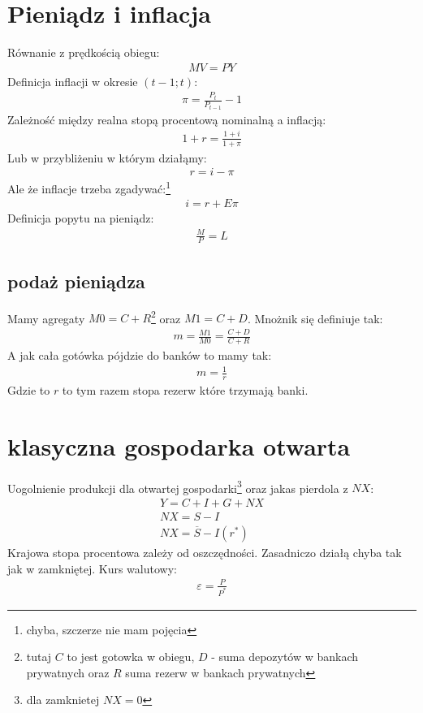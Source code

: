 \documentclass{article}
\begin{document}
\section{Pieniądz i inflacja}
Równanie z prędkością obiegu:
\begin{gather}
    MV = PY
\end{gather}
Definicja inflacji w okresie \((t-1; t)\):
\begin{gather}
    \pi = \frac{P_{t}}{P_{t-1}} - 1
\end{gather}
Zależność między realna stopą procentową nominalną a inflacją:
\begin{gather}
    1 + r = \frac{1+i}{1+\pi}
\end{gather}
Lub w przybliżeniu w którym działąmy:
\begin{gather}
    r = i -\pi
\end{gather}
Ale że inflacje trzeba zgadywać:\footnote{chyba, szczerze nie mam pojęcia}
\begin{gather}
    i = r + E\pi
\end{gather}
Definicja popytu na pieniądz:
\begin{gather}
    \frac{M}{P} = L
\end{gather}
\subsection{podaż pieniądza}
Mamy agregaty \(M0 = C + R\)\footnote{tutaj \(C\) to jest gotowka w obiegu, \(D\) - suma depozytów w bankach
prywatnych oraz \(R\) suma rezerw w bankach prywatnych} oraz \(M1 = C + D\). Mnożnik się definiuje tak:
\begin{gather}
    m=\frac{M1}{M0} = \frac{C+D}{C + R}
\end{gather}
A jak cała gotówka pójdzie do banków to mamy tak:
\begin{gather}
    m = \frac{1}{r}
\end{gather}
Gdzie to \(r\) to tym razem stopa rezerw które trzymają banki.
\section{klasyczna gospodarka otwarta}
Uogolnienie produkcji dla otwartej gospodarki\footnote{dla zamknietej \(NX = 0\)} oraz jakas pierdola z \(NX\):
\begin{gather}
    Y = C + I + G + NX\\
    NX = S - I\\
    NX = \overline{S} - I(r^*)
\end{gather}
Krajowa stopa procentowa zależy od oszczędności. Zasadniczo działą chyba tak jak w zamkniętej.
Kurs walutowy:
\begin{gather}
    \varepsilon = \frac{P}{P^*}
\end{gather}
\end{document}
